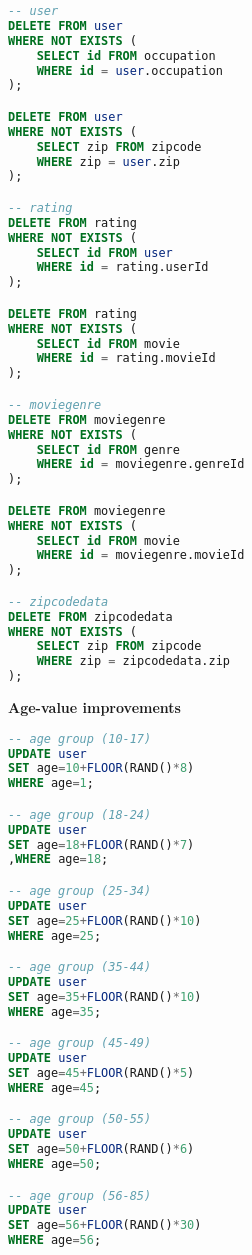 \begin{lstlisting}[language=sql]
-- user
DELETE FROM user
WHERE NOT EXISTS (
	SELECT id FROM occupation
	WHERE id = user.occupation
);

DELETE FROM user
WHERE NOT EXISTS (
	SELECT zip FROM zipcode
	WHERE zip = user.zip
);

-- rating
DELETE FROM rating
WHERE NOT EXISTS (
	SELECT id FROM user
	WHERE id = rating.userId
);

DELETE FROM rating
WHERE NOT EXISTS (
	SELECT id FROM movie
	WHERE id = rating.movieId
);

-- moviegenre
DELETE FROM moviegenre
WHERE NOT EXISTS (
	SELECT id FROM genre
	WHERE id = moviegenre.genreId
);

DELETE FROM moviegenre
WHERE NOT EXISTS (
	SELECT id FROM movie
	WHERE id = moviegenre.movieId
);

-- zipcodedata
DELETE FROM zipcodedata
WHERE NOT EXISTS (
	SELECT zip FROM zipcode
	WHERE zip = zipcodedata.zip
);
\end{lstlisting}
\bigskip

\noindent\textbf{Age-value improvements} \\

\begin{lstlisting}[language=sql]
-- age group (10-17)
UPDATE user
SET age=10+FLOOR(RAND()*8)
WHERE age=1;

-- age group (18-24)
UPDATE user
SET age=18+FLOOR(RAND()*7)
,WHERE age=18;

-- age group (25-34)
UPDATE user
SET age=25+FLOOR(RAND()*10)
WHERE age=25;

-- age group (35-44)
UPDATE user
SET age=35+FLOOR(RAND()*10)
WHERE age=35;

-- age group (45-49)
UPDATE user
SET age=45+FLOOR(RAND()*5)
WHERE age=45;

-- age group (50-55)
UPDATE user
SET age=50+FLOOR(RAND()*6)
WHERE age=50;

-- age group (56-85)
UPDATE user
SET age=56+FLOOR(RAND()*30)
WHERE age=56;
\end{lstlisting}
